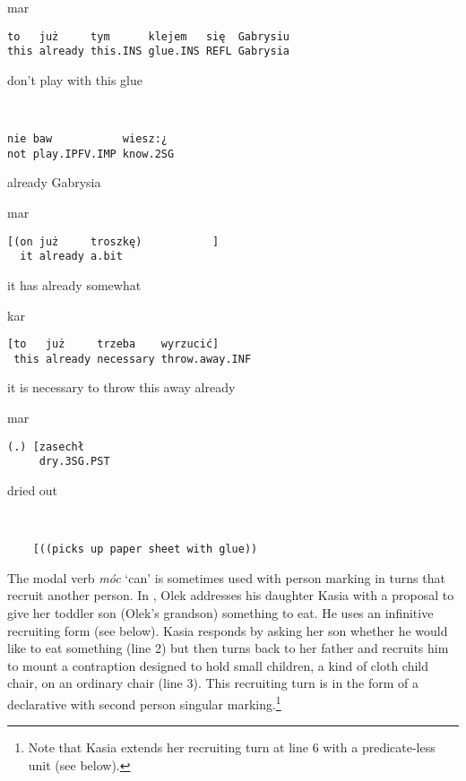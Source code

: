 \documentclass[output=paper]{langsci/langscibook}
\begin{document}
\vspace{2mm}
%
\begin{transbox}{1}{mar}
\begin{verbatim}
to   już     tym      klejem   się  Gabrysiu
this already this.INS glue.INS REFL Gabrysia
\end{verbatim}
don’t play with this glue
\end{transbox}
%
\begin{transbox}{2}{~}
\begin{verbatim}
nie baw           wiesz:¿
not play.IPFV.IMP know.2SG
\end{verbatim}
already Gabrysia
\end{transbox}
%
%
\begin{transbox}{4}{mar}
\begin{verbatim}
[(on już     troszkę)           ]
  it already a.bit
\end{verbatim}
\hspace{0.2cm} it has already somewhat
\end{transbox}
%
\begin{mdframednoverticalspace}[style=firstfoc]
\begin{transbox}{5}{kar}
\begin{verbatim}
[to   już     trzeba    wyrzucić]
 this already necessary throw.away.INF
\end{verbatim}
\hspace{0.07cm} it is necessary to throw this away already
\end{transbox}
\end{mdframednoverticalspace}
%
\begin{transbox}{6}{mar}
\begin{verbatim}
(.) [zasechł
     dry.3SG.PST
\end{verbatim}
\hspace{0.7cm} dried out
\end{transbox}
%
\begin{mdframednoverticalspace}[style=secondfoc]
\begin{transbox}{7}{~}
\begin{verbatim}
    [((picks up paper sheet with glue))
\end{verbatim}
\end{transbox}
\end{mdframednoverticalspace}


The modal verb \textit{móc} ‘can’ is sometimes used with person marking in turns that recruit another person.  In , Olek addresses his daughter Kasia with a proposal to give her toddler son (Olek's grandson) something to eat.  He uses an infinitive recruiting form (see  below).  Kasia responds by asking her son whether he would like to eat something (line 2) but then turns back to her father and recruits him to mount a contraption designed to hold small children, a kind of cloth child chair, on an ordinary chair (line 3).  This recruiting turn is in the form of a declarative with second person singular marking.\footnote{Note that Kasia extends her recruiting turn at line 6 with a predicate-less unit (see  below).}
\end{document}
